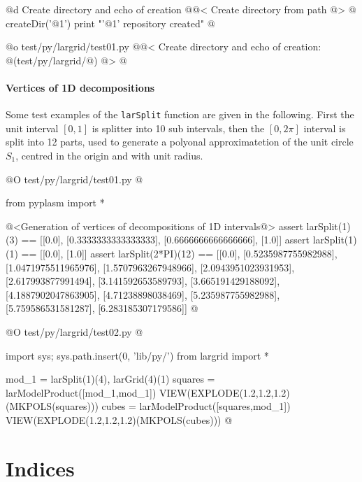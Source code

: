 \documentclass[11pt,oneside]{article}	%
\begin{document}
@d Create directory and echo of creation
@{@< Create directory from path @>
@%
createDir('@1')
print "'@1' repository created"
@}

@o test/py/largrid/test01.py
@{@< Create directory  and echo of creation: @(test/py/largrid/@) @>
@}


\paragraph{Vertices of 1D decompositions}
Some test examples of the \texttt{larSplit} function are given in the following. First the unit interval $[0,1]$ is splitter into 10 sub intervals, then the $[0,2\pi]$ interval is split into 12 parts, used to generate a polyonal approximatetion of the unit circle $S_1$, centred in the origin and with unit radius.

@O test/py/largrid/test01.py
@{from pyplasm import *

@<Generation of vertices of decompositions of 1D intervals@>
assert larSplit(1)(3) == [[0.0], [0.3333333333333333], [0.6666666666666666], [1.0]]
assert larSplit(1)(1) == [[0.0], [1.0]]
assert larSplit(2*PI)(12) == [[0.0], [0.5235987755982988], [1.0471975511965976], 
[1.5707963267948966], [2.0943951023931953], [2.617993877991494], 
[3.141592653589793], [3.665191429188092], [4.1887902047863905], 
[4.71238898038469], [5.235987755982988], [5.759586531581287], 
[6.283185307179586]]
@}


@O test/py/largrid/test02.py
@{import sys; sys.path.insert(0, 'lib/py/')
from largrid import *

mod_1 = larSplit(1)(4), larGrid(4)(1)
squares = larModelProduct([mod_1,mod_1])
VIEW(EXPLODE(1.2,1.2,1.2)(MKPOLS(squares)))
cubes = larModelProduct([squares,mod_1])
VIEW(EXPLODE(1.2,1.2,1.2)(MKPOLS(cubes)))
@}


\section{Indices}
\label{sec:indices}
\end{document}
